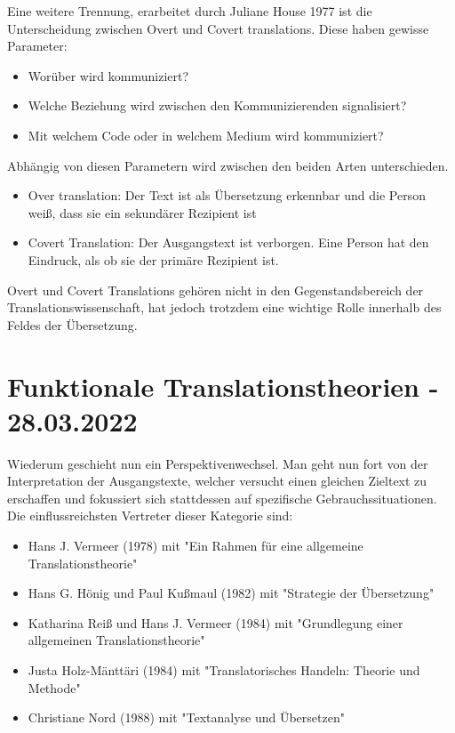 \documentclass{article}
\begin{document}
	Eine weitere Trennung, erarbeitet durch Juliane House 1977 ist die Unterscheidung zwischen Overt und Covert translations.
	Diese haben gewisse Parameter:
	\begin{itemize}
	 	\item{Worüber wird kommuniziert?}
	 	\item{Welche Beziehung wird zwischen den Kommunizierenden signalisiert?}
	 	\item{Mit welchem Code oder in welchem Medium wird kommuniziert?}
	 \end{itemize} 
	 Abhängig von diesen Parametern wird zwischen den beiden Arten unterschieden.
	\begin{itemize}
		\item{Over translation: Der Text ist als Übersetzung erkennbar und die Person weiß, dass sie ein sekundärer Rezipient ist}
		\item{Covert Translation: Der Ausgangstext ist verborgen. Eine Person hat den Eindruck, als ob sie der primäre Rezipient ist.}
	\end{itemize}
	Overt und Covert Translations gehören nicht in den Gegenstandsbereich der Translationswissenschaft, hat jedoch trotzdem eine wichtige Rolle innerhalb des Feldes der Übersetzung.

	\section{Funktionale Translationstheorien - 28.03.2022}

	Wiederum geschieht nun ein Perspektivenwechsel. Man geht nun fort von der Interpretation der Ausgangstexte, welcher versucht einen gleichen Zieltext zu erschaffen und fokussiert sich stattdessen auf spezifische Gebrauchssituationen. \\
	Die einflussreichsten Vertreter dieser Kategorie sind:
	\begin{itemize}
		\item{Hans J. Vermeer (1978) mit "Ein Rahmen für eine allgemeine Translationstheorie"}
		\item{Hans G. Hönig und Paul Kußmaul (1982) mit "Strategie der Übersetzung"}
		\item{Katharina Reiß und Hans J. Vermeer (1984) mit "Grundlegung einer allgemeinen Translationstheorie"}
		\item{Justa Holz-Mänttäri (1984) mit "Translatorisches Handeln: Theorie und Methode"}
		\item{Christiane Nord (1988) mit "Textanalyse und Übersetzen"}
	\end{itemize}
\end{document}
